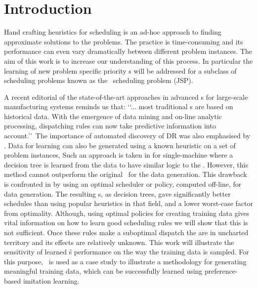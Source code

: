 \documentclass[smallextended]{svjour3}
\begin{document}

\section{Introduction}\label{sec:introduction}

Hand crafting heuristics for scheduling is an ad-hoc approach to finding approximate solutions to the problems. The practice is time-consuming and its performance can even vary dramatically between different problem instances. The aim of this work is to increase our understanding of this process. In particular the learning of new problem specific priority \dr s will be addressed for
a subclass of scheduling problems known as the \jsp\ scheduling problem (JSP). 

A recent editorial of the state-of-the-art approaches \cite{Chen13} in advanced \dr s for 
large-scale manufacturing systems reminds us that:
\lq\lq ... most traditional \dr s are based on historical data. 
With the emergence of data mining and on-line analytic processing, dispatching 
rules can now take predictive information into account.\rq\rq~The importance of 
automated discovery of DR was also emphasised by \cite{Monch13}. Data for learning
can also be generated using a known heuristic on a set of problem instances,
Such an approach is taken in \cite{Siggi05} for single-machine where
a decision tree is learned from the data to have similar logic to the \dr.  
However, this method cannot outperform the original \dr\ for the data generation. 
This drawback is confronted in \cite{Malik08,Russell09,Siggi10} by using an 
optimal scheduler or policy, computed off-line, for data generation. The 
resulting \dr s, as decision trees, gave significantly better schedules than using popular 
heuristics in that field, and a lower worst-case factor from optimality. 
Although, using optimal policies for creating training data gives vital 
information on how to learn good scheduling rules we will show that this is 
not sufficient. Once these rules make a suboptimal dispatch the are in uncharted 
territory and its effects are relatively unknown.  
This work will illustrate the sensitivity of learned \dr\'s performance on the way 
the training data is sampled.
For this purpose, \JSP\ is used as a case study to illustrate a methodology for 
generating meaningful training data, which can be successfully 
learned using preference-based imitation learning.
\end{document}
